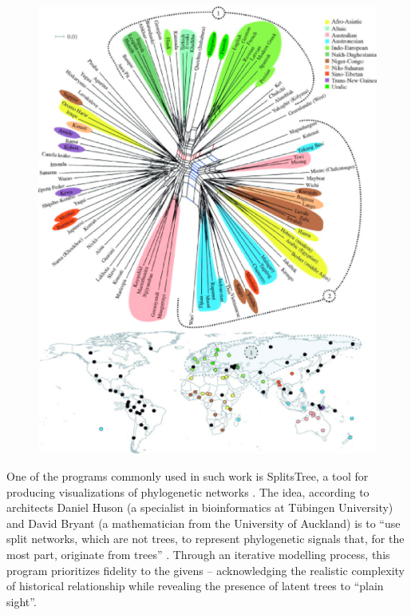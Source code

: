 \documentclass[output=paper]{langscibook}
\begin{document}
\begin{figure}
    \centering
    \includegraphics[scale=0.8]{figures/greenhiletal2010.png}
    \caption{\citet[2445]{Greenhilletal2010}}
    \label{fig:kaplan:greenhill2010}
\end{figure}

One of the programs commonly used in such work is SplitsTree, a tool for producing visualizations of phylogenetic networks \citep{Greenhilletal2010}. The idea, according to architects Daniel Huson (a specialist in bioinformatics at Tübingen University) and David Bryant (a mathematician from the University of Auckland) is to ``use split networks, which are not trees, to represent phylogenetic signals that, for the most part, originate from trees'' \citep[254--267]{HusonBryant2006}. Through an iterative modelling process, this program prioritizes fidelity to the givens -- acknowledging the realistic complexity of historical relationship while revealing the presence of latent trees to ``plain sight''.
\end{document}
